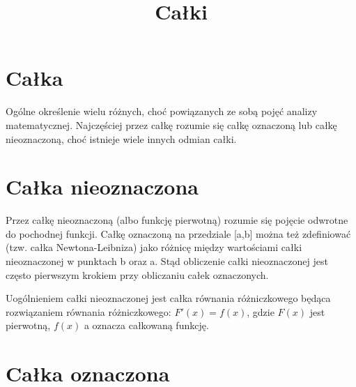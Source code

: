 \documentclass{article}
\title{Całki}
\begin{document}
\maketitle
\tableofcontents
\section{Całka}
Ogólne określenie wielu różnych, choć powiązanych ze sobą pojęć analizy matematycznej. Najczęściej przez całkę rozumie się całkę oznaczoną lub całkę nieoznaczoną, choć istnieje wiele innych odmian całki.
\section{Całka nieoznaczona}
Przez całkę nieoznaczoną (albo funkcję pierwotną) rozumie się pojęcie odwrotne do pochodnej funkcji. Całkę oznaczoną na przedziale [a,b] można też zdefiniować (tzw. całka Newtona-Leibniza) jako różnicę między wartościami całki nieoznaczonej w punktach b oraz a. Stąd obliczenie całki nieoznaczonej jest często pierwszym krokiem przy obliczaniu całek oznaczonych.

Uogólnieniem całki nieoznaczonej jest całka równania różniczkowego będąca rozwiązaniem równania różniczkowego: $F'(x)=f(x)$, gdzie $F(x)$ jest pierwotną, $f(x)$ a oznacza całkowaną funkcję.
\section{Całka oznaczona}
\end{document}
